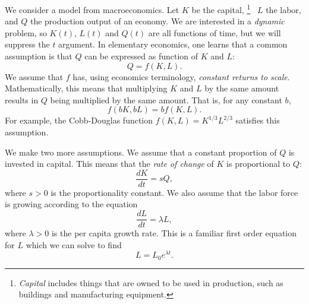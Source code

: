 \documentclass[reqno]{immbook}
\numberwithin{equation}{chapter}
\numberwithin{question}{section}
\numberwithin{theorem}{chapter}
\numberwithin{figure}{chapter}
\theoremstyle{definition}
\begin{document}
\medskip
We consider a model from macroeconomics.
Let $K$ be the capital,%
\footnote{\emph{Capital} includes things that are owned to be used
in production, such as buildings and manufacturing equipment.}%
~$L$ the labor, and $Q$ the production output of an economy.
We are interested in a \emph{dynamic} problem, so $K(t)$, $L(t)$ and
$Q(t)$ are all functions of time, but we will suppress the $t$ argument.
In elementary economics, one learns that a common assumption is that
$Q$ can be expressed as function of $K$ and $L$:
\begin{equation}
   Q = f(K,L).
   \label{EQN:PROD}
\end{equation}
We assume that $f$ has, using economics terminology,
\emph{constant returns to scale}.  Mathematically, this means
that multiplying $K$ and $L$ by the same amount results in $Q$ being
multiplied by the same amount.  That is, for any constant $b$,
\begin{equation}
   f(bK,bL) = bf(K,L).
\end{equation}
For example, the Cobb-Douglas function
$f(K,L) = K^{1/3}L^{2/3}$
satisfies this assumption.

We make two more assumptions.
We assume that a constant proportion of $Q$ is invested in capital.
This means that the \emph{rate of change} of $K$ is proportional to
$Q$:
\begin{equation}
    \frac{dK}{dt} = s Q,
\label{EQN:DKDT}
\end{equation}
where $s > 0$ is the proportionality constant.
We also assume that the labor force is growing according
to the equation
\begin{equation}
   \frac{dL}{dt} = \lambda L,
   \label{EQN:DLDT}
\end{equation}
where $\lambda > 0$ is the per capita growth rate.  This is a
familiar first order equation for $L$ which we can solve to find 
\begin{equation}
    L = L_0 e^{\lambda t}.
\label{eqn:solowLsol}
\end{equation}
\end{document}
